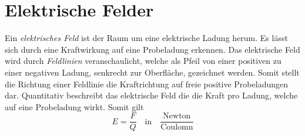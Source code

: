 \documentclass{article}
\begin{document}
 
\section{Elektrische Felder}
Ein \emph{elektrisches Feld} ist der Raum um eine elektrische Ladung herum. Es lässt sich durch eine Kraftwirkung auf eine Probeladung erkennen. \newline
Das elektrische Feld wird durch \emph{Feldlinien} veranschaulicht, welche als Pfeil von einer positiven zu einer negativen Ladung, senkrecht zur Oberfläche, gezeichnet werden. Somit stellt die Richtung einer Feldlinie die Kraftrichtung auf freie positive Probeladungen dar. \newline
Quantitativ beschreibt das elektrische Feld die die Kraft pro Ladung, welche auf eine Probeladung wirkt. Somit gilt
\[
 E = \frac{F}{Q}
 \quad \text{in} \quad
 \frac{\text{Newton}}{\text{Coulomn}} 
\] 
 
\end{document}
